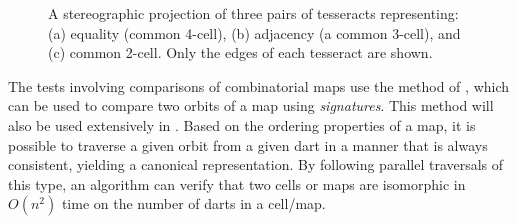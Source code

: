 \begin{figure}[tb]
\centering
{}
{}
{}
\caption[Three pairs of tesseracts]{A stereographic projection of three pairs of tesseracts representing: (a) equality (common 4-cell), (b) adjacency (a common 3-cell), and (c) common 2-cell. Only the edges of each tesseract are shown.}
\label{fig:tesseract-tests}
\end{figure}

The tests involving comparisons of combinatorial maps use the method of \citet{Gosselin11}, which can be used to compare two orbits of a map using \emph{signatures}.
This method will also be used extensively in .
Based on the ordering properties of a map, it is possible to traverse a given orbit from a given dart in a manner that is always consistent, yielding a canonical representation.
By following parallel traversals of this type, an algorithm can verify that two cells or maps are isomorphic in $O(n^2)$ time on the number of darts in a cell/map.


